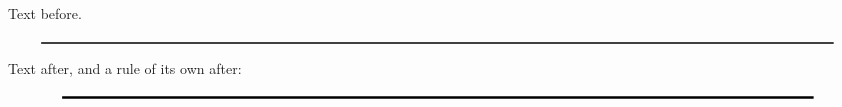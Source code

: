 \documentclass{article}
\begin{document}
Text before.
\[ \rule{20cm}{1pt} \]
Text after, and a rule of its own after:
{\overfullrule=5pt \[ \rule{19cm}{2pt} \]}
\end{document}

